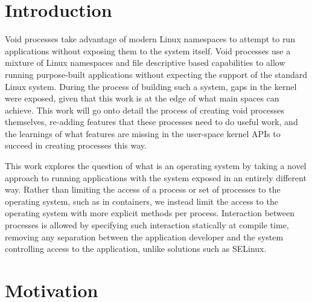 \documentclass[sigplan]{acmart}
\begin{document}



\maketitle

\section{Introduction}

Void processes take advantage of modern Linux namespaces to attempt to run applications without exposing them to the system itself. Void processes use a mixture of Linux namespaces and file descriptive based capabilities to allow running purpose-built applications without expecting the support of the standard Linux system. During the process of building such a system, gaps in the kernel were exposed, given that this work is at the edge of what main spaces can achieve. This work will go onto detail the process of creating void processes themselves, re-adding features that these processes need to do useful work, and the learnings of what features are missing in the user-space kernel APIs to succeed in creating processes this way.

This work explores the question of what is an operating system by taking a novel approach to running applications with the system exposed in an entirely different way. Rather than limiting the access of a process or set of processes to the operating system, such as in containers, we instead limit the access to the operating system with more explicit methods per process. Interaction between processes is allowed by specifying such interaction statically at compile time, removing any separation between the application developer and the system controlling access to the application, unlike solutions such as SELinux.

\section{Motivation}
\label{sec:motivation}
\end{document}
